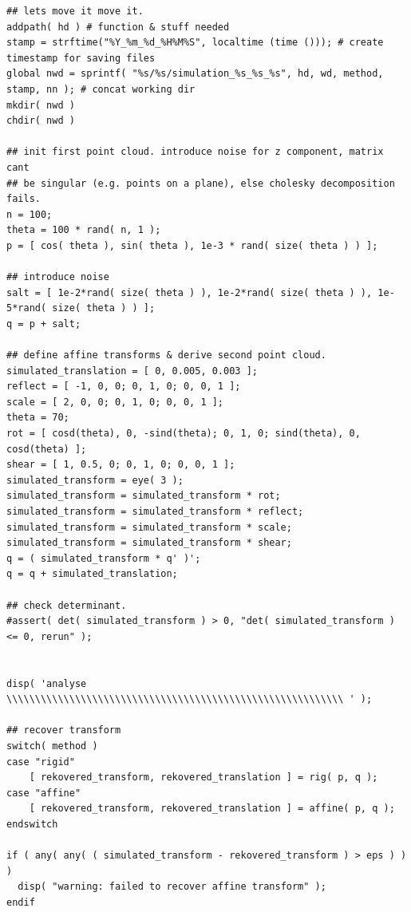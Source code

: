 \documentclass[11pt, a4paper, oneside, twocolumn]{report}
\begin{document}
\begin{verbatim}
## lets move it move it.
addpath( hd ) # function & stuff needed
stamp = strftime("%Y_%m_%d_%H%M%S", localtime (time ())); # create timestamp for saving files
global nwd = sprintf( "%s/%s/simulation_%s_%s_%s", hd, wd, method, stamp, nn ); # concat working dir
mkdir( nwd )
chdir( nwd )

## init first point cloud. introduce noise for z component, matrix cant
## be singular (e.g. points on a plane), else cholesky decomposition fails.
n = 100;
theta = 100 * rand( n, 1 );
p = [ cos( theta ), sin( theta ), 1e-3 * rand( size( theta ) ) ];

## introduce noise
salt = [ 1e-2*rand( size( theta ) ), 1e-2*rand( size( theta ) ), 1e-5*rand( size( theta ) ) ];
q = p + salt;

## define affine transforms & derive second point cloud.
simulated_translation = [ 0, 0.005, 0.003 ];
reflect = [ -1, 0, 0; 0, 1, 0; 0, 0, 1 ];
scale = [ 2, 0, 0; 0, 1, 0; 0, 0, 1 ];
theta = 70;
rot = [ cosd(theta), 0, -sind(theta); 0, 1, 0; sind(theta), 0, cosd(theta) ];
shear = [ 1, 0.5, 0; 0, 1, 0; 0, 0, 1 ];
simulated_transform = eye( 3 );
simulated_transform = simulated_transform * rot;
simulated_transform = simulated_transform * reflect;
simulated_transform = simulated_transform * scale;
simulated_transform = simulated_transform * shear;
q = ( simulated_transform * q' )';
q = q + simulated_translation;

## check determinant.
#assert( det( simulated_transform ) > 0, "det( simulated_transform ) <= 0, rerun" );


disp( 'analyse \\\\\\\\\\\\\\\\\\\\\\\\\\\\\\\\\\\\\\\\\\\\\\\\\\\\\\\\\\\ ' );

## recover transform
switch( method )
case "rigid"
    [ rekovered_transform, rekovered_translation ] = rig( p, q );
case "affine"
    [ rekovered_transform, rekovered_translation ] = affine( p, q );
endswitch

if ( any( any( ( simulated_transform - rekovered_transform ) > eps ) ) )
  disp( "warning: failed to recover affine transform" );
endif
\end{verbatim}
\end{document}
